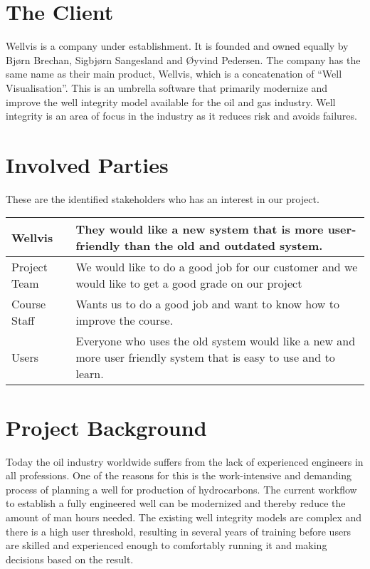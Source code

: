 \documentclass{report}
\begin{document}
\newpage
\section{The Client} \label{sec:the_client}
Wellvis is a company under establishment. It is founded and owned equally by Bjørn Brechan, Sigbjørn Sangesland and Øyvind Pedersen. The company has the same name as their main product, Wellvis, which is a concatenation of “Well Visualisation”. This is an umbrella software that primarily modernize and improve the well integrity model available for the oil and gas industry. Well integrity is an area of focus in the industry as it reduces risk and avoids failures.

\newpage
\section{Involved Parties} \label{sec:involved_parties}
These are the identified stakeholders who has an interest in our project.

\begin{tabular}{|l | p{8.5cm}|} \hline
Wellvis & They would like a new system that is more user-friendly than the old and outdated system. \\ \hline
Project Team & We would like to do a good job for our customer and we would like to get a good grade on our project \\ \hline
Course Staff & Wants us to do a good job and want to know how to improve the course. \\ \hline
Users & Everyone who uses the old system would like a new and more user friendly system that is easy to use and to learn. \\ \hline
\end{tabular}

\newpage
\section{Project Background} \label{sec:project_background}
Today the oil industry worldwide suffers from the lack of experienced engineers in all professions. One of the reasons for this is the work-intensive and demanding process of planning a well for production of hydrocarbons. The current workflow to establish a fully engineered well can be modernized and thereby reduce the amount of man hours needed. The existing well integrity models are complex and there is a high user threshold, resulting in several years of training before users are skilled and experienced enough to comfortably running it and making decisions based on the result.
\end{document}
